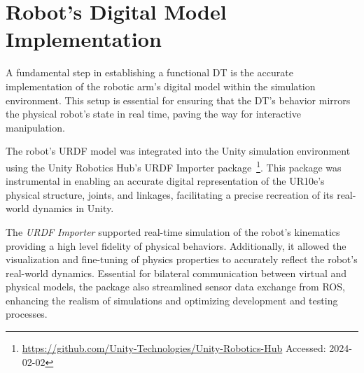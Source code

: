 





\section{Robot's Digital Model Implementation}
\label{section:digital-model}

A fundamental step in establishing a functional \ac{DT} is the accurate implementation of the robotic arm's digital model within the simulation environment. This setup is essential for ensuring that the \ac{DT}'s behavior mirrors the physical robot’s state in real time, paving the way for interactive manipulation.

The robot's \ac{URDF} model was integrated into the Unity simulation environment using the Unity Robotics Hub's \ac{URDF} Importer package~\footnote{\url{https://github.com/Unity-Technologies/Unity-Robotics-Hub} Accessed: 2024-02-02}. This package was instrumental in enabling an accurate digital representation of the UR10e’s physical structure, joints, and linkages, facilitating a precise recreation of its real-world dynamics in Unity.

The \textit{\ac{URDF} Importer} supported real-time simulation of the robot's kinematics providing a high level fidelity of physical behaviors. Additionally, it allowed the visualization and fine-tuning of physics properties to accurately reflect the robot's real-world dynamics. Essential for bilateral communication between virtual and physical models, the package also streamlined sensor data exchange from \ac{ROS}, enhancing the realism of simulations and optimizing development and testing processes.

